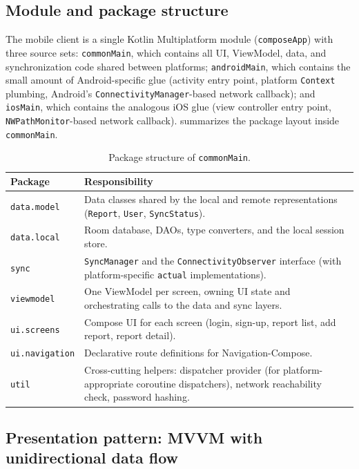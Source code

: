 \subsection{Module and package structure}

The mobile client is a single Kotlin Multiplatform module
(\texttt{composeApp}) with three source sets: \texttt{commonMain}, which
contains all UI, ViewModel, data, and synchronization code shared between
platforms; \texttt{androidMain}, which contains the small amount of
Android-specific glue (activity entry point, platform \texttt{Context}
plumbing, Android's \texttt{ConnectivityManager}-based network callback);
and \texttt{iosMain}, which contains the analogous iOS glue (view
controller entry point, \texttt{NWPathMonitor}-based network callback).
 summarizes the package layout inside
\texttt{commonMain}.

\begin{table}[htbp]
\centering
\caption{Package structure of \texttt{commonMain}.}
\label{tab:package-structure}
\begin{tabularx}{\textwidth}{@{}l X@{}}
\toprule
\textbf{Package} & \textbf{Responsibility} \\
\midrule
\texttt{data.model} & Data classes shared by the local and remote
representations (\texttt{Report}, \texttt{User}, \texttt{SyncStatus}). \\
\texttt{data.local} & Room database, DAOs, type converters, and the local
session store. \\
\texttt{sync} & \texttt{SyncManager} and the \texttt{ConnectivityObserver}
interface (with platform-specific \texttt{actual} implementations). \\
\texttt{viewmodel} & One ViewModel per screen, owning UI state and
orchestrating calls to the data and sync layers. \\
\texttt{ui.screens} & Compose UI for each screen (login, sign-up, report
list, add report, report detail). \\
\texttt{ui.navigation} & Declarative route definitions for
Navigation-Compose. \\
\texttt{util} & Cross-cutting helpers: dispatcher provider (for
platform-appropriate coroutine dispatchers), network reachability check,
password hashing. \\
\bottomrule
\end{tabularx}
\end{table}

\subsection{Presentation pattern: MVVM with unidirectional data flow}

